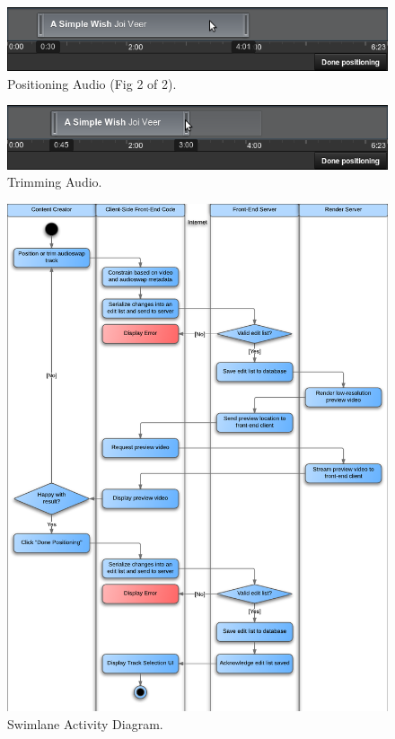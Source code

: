 \documentclass[se,resubmit]{uw-wkrpt}
\begin{document}
\begin{figure}
  \centering
  \includegraphics[width=6.25in]{position-drag-end}
  \caption{Positioning Audio (Fig 2 of 2).}
  \label{fig:position-drag-end}
\end{figure}

\begin{figure}
  \centering
  \includegraphics[width=6.25in]{trim}
  \caption{Trimming Audio.}
  \label{fig:trim}
\end{figure}

\begin{figure}
  \centering
  \includegraphics{swimlane}
  \caption{Swimlane Activity Diagram.}
  \label{fig:swimlane}
\end{figure}
\end{document}
